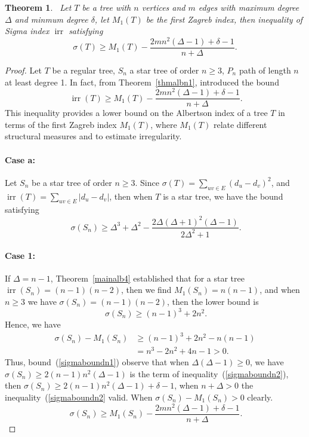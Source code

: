 \documentclass[12pt]{amsart}
\newcommand{\irr}{\operatorname{irr}}
\newcommand{\case}[1]{\paragraph*{Case #1:}}
\newtheorem{theorem}{Theorem}[section]
\begin{document}
\begin{theorem}~\label{thmsign1}
Let $T$ be a tree with $n$ vertices and $m$ edges with maximum degree $\Delta$ and minmum  degree $\delta$, let $M_1(T)$ be the first Zagreb index, then inequality of Sigma index $\irr$ satisfying 
\[
\sigma(T) \geq M_1(T)  - \frac{2mn^2(\Delta - 1)+\delta-1}{n+\Delta}.
\]
\end{theorem}
\begin{proof}
Let $T$ be a regular tree, $S_n$ a star tree of order $n\geq 3$, $P_n$ path of length $n$ at least degree 1. In fact, from Theorem~\ref{thmalbn1}, introduced the bound 
\begin{equation}~\label{tessign1}
\irr(T) \geq M_1(T)  - \frac{2mn^2(\Delta - 1)+\delta-1}{n+\Delta}.
\end{equation}
This inequality provides a lower bound on the Albertson index of a tree $T$ in terms of the first Zagreb index $M_1(T)$, where $M_1(T)$ relate different structural measures and to estimate irregularity. 
\case{a} Let $S_n$ be a star tree of order $n\geq 3$. Since $\sigma(T)=\sum_{uv\in E}(d_u-d_v)^2$, and $\irr(T)=\sum_{uv\in E}\lvert d_u-d_v\rvert$, then when $T$ is a star tree, we have the bound satisfying
\begin{equation}~\label{sigmaboundn1}
    \sigma(S_n) \geq \Delta^3 + \Delta^2 - \frac{2 \Delta (\Delta + 1)^2 (\Delta - 1)}{2\Delta^2 + 1}.
\end{equation}
\case{1} If $\Delta=n-1$, Theorem~\ref{mainalb4} established that for a star tree $\irr(S_n)=(n-1)(n-2)$, then we find $M_1(S_n)=n(n-1)$, and when $n\geq 3$ we have $\sigma(S_n)=(n-1)(n-2)$, then the lower bound is
\begin{equation}~\label{eqqsigmasatn1}
\sigma(S_n) \geq (n-1)^3+2n^2.
\end{equation}
Hence, we have
\begin{align*}
 \sigma(S_n)-M_1(S_n) & \geq (n-1)^3+2n^2-n(n-1)\\
 &=n^3 - 2 n^2 + 4 n - 1>0.
\end{align*}
Thus, bound~(\ref{sigmaboundn1}) observe that when $\Delta(\Delta-1)\geq 0$, we have $\sigma(S_n) \geq 2(n-1)n^2(\Delta - 1)$ is the term of inequality~(\ref{sigmaboundn2}), then $\sigma(S_n) \geq 2(n-1)n^2(\Delta - 1)+\delta-1$, when $n+\Delta>0$ the inequality~(\ref{sigmaboundn2} valid. When $\sigma(S_n)-M_1(S_n)>0$ clearly. 
\begin{equation}~\label{sigmaboundn2}
     \sigma(S_n) \geq M_1(S_n)  - \frac{2mn^2(\Delta - 1)+\delta-1}{n+\Delta}.
\end{equation}

\end{proof}
\end{document}

